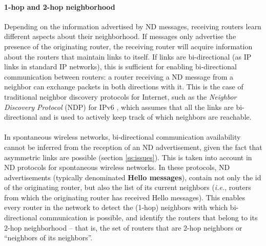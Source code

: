
\paragraph{1-hop and 2-hop neighborhood}

Depending on the information advertised by ND messages, receiving routers learn different aspects about their neighborhood. If messages only advertise the presence of the originating router, the receiving router will acquire information about the routers that maintain links to itself. If links are bi-directional (as IP links in standard IP networks), this is sufficient for enabling bi-directional communication between routers: a router receiving a ND message from a neighbor can exchange packets in both directions with it. This is the case of traditional neighbor discovery protocols for Internet, such as the \textit{Neighbor Discovery Protocol} (NDP) for IPv6 \cite{rfc4861}, which assumes that all the links are bi-directional and is used to actively keep track of which neighbors are reachable. \ \\ \ \\
%
%
In spontaneous wireless networks, bi-directional communication availability cannot be inferred from the reception of an ND advertisement, given the fact that asymmetric links are possible (section \ref{ss:issues}). This is taken into account in ND protocols for spontaneous wireless networks. In these protocols, ND advertisements (typically denominated {\bf Hello messages}), contain not only the id of the originating router, but also the list of its current neighbors ({\em i.e.}, routers from which the originating router has received Hello messages). This enables every router in the network to detect the (1-hop) neighbors with which bi-directional communication is possible, and identify the routers that belong to its 2-hop neighborhood -- that is, the set of routers that are 2-hop neighbors or ``neighbors of its neighbors''. 

